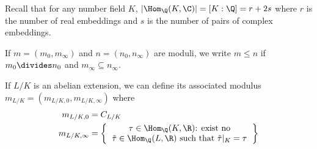\documentclass[a4paper]{article}
\begin{document}
Recall that for any number field \(K\), \(|\Hom_\Q(K, \C)| = [K : \Q] = r + 2s\) where \(r\) is the number of real embeddings and \(s\) is the number of pairs of complex embeddings.

If \(m = (m_0, m_\infty)\) and \(n = (n_0, n_\infty)\) are moduli, we write \(m \leq n\) if \(m_0 \divides n_0\) and \(m_\infty \subseteq n_\infty\).

If \(L/K\) is an abelian extension, we can define its associated modulus \(m_{L/K} = (m_{L/K, 0}, m_{L/K, \infty})\) where
\begin{align*}
  m_{L/K, 0} &= C_{L/K} \\
  m_{L/K, \infty} &=
                    \left\{
                    \begin{tabular}{c}
                      \(\tau \in \Hom_\Q(K, \R)\): exist no \\
                      \(\tilde \tau \in \Hom_\Q(L, \R)\) such that \(\tilde \tau|_K = \tau\)
                    \end{tabular}
                    \right\}
\end{align*}
\end{document}
